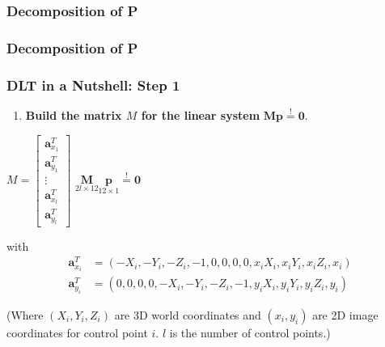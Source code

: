 \begin{frame}
  \frametitle{Decomposition of P}
  
\end{frame}

\begin{frame}
  \frametitle{Decomposition of P}
  
\end{frame}


\begin{frame}
  \frametitle{DLT in a Nutshell: Step 1}
    \begin{enumerate}
        \item \textbf{Build the matrix $M$ for the linear system} $\mathbf{M p} \stackrel{!}{=} \mathbf{0}$.
    \end{enumerate}
    \vspace{0.5cm}
    \begin{center}
        $M = \begin{bmatrix}
            \mathbf{a}_{x_1}^T \\
            \mathbf{a}_{y_1}^T \\
            \vdots \\
            \mathbf{a}_{x_l}^T \\
            \mathbf{a}_{y_l}^T
        \end{bmatrix}$
        \qquad
        $\underset{2l \times 12}{\mathbf{M}} \underset{12 \times 1}{\mathbf{p}} \stackrel{!}{=} \mathbf{0}$
        
        \vspace{0.5cm}
        with
        \begin{align*}
            \mathbf{a}_{x_i}^T &= (-X_i, -Y_i, -Z_i, -1, 0, 0, 0, 0, x_iX_i, x_iY_i, x_iZ_i, x_i) \\
            \mathbf{a}_{y_i}^T &= (0, 0, 0, 0, -X_i, -Y_i, -Z_i, -1, y_iX_i, y_iY_i, y_iZ_i, y_i)
        \end{align*}
    \end{center}
    \footnotesize{(Where $(X_i, Y_i, Z_i)$ are 3D world coordinates and $(x_i, y_i)$ are 2D image coordinates for control point $i$. $l$ is the number of control points.)}
\end{frame}

